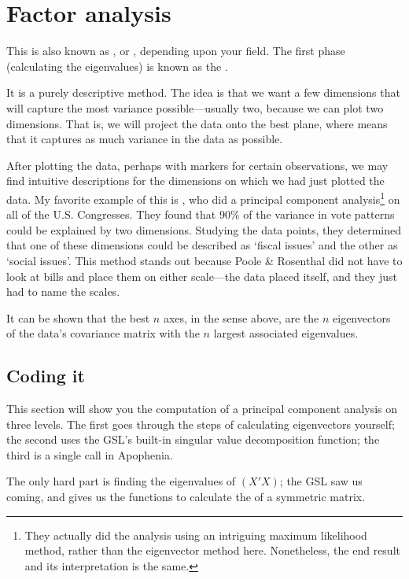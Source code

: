 \section{Factor analysis} \label{pca} 
This is also known as , or , depending upon your field. 
The first phase (calculating the eigenvalues) is known as the .

It is a purely descriptive method.  The idea is that we want a few
dimensions that will capture the most variance possible---usually two,
because we can plot two dimensions. That is, we will project the data
onto the best plane, where  means that it captures as much
variance in the data as possible.

After plotting the data, perhaps with markers for certain observations,
we may find intuitive descriptions for the dimensions on which we had just plotted the
data. My favorite example of this is \citet{poole:rosenthal},
who did a principal component analysis\footnote{They actually did
the analysis using an intriguing maximum likelihood method, rather
than the eigenvector method here. Nonetheless, the end result and its
interpretation is the same.} on all of the U.S. Congresses. They found
that 90\% of the variance in vote patterns could be explained by two dimensions.
Studying the data points, they determined that one of these dimensions could be
described as `fiscal issues' and the other as `social issues'. This method stands
out because Poole \& Rosenthal did not have to look at bills and place them on
either scale---the data placed itself, and they just had to name the scales.


It can be shown that the best $n$ axes, in the sense above, are the
$n$ eigenvectors of the data's covariance matrix with the $n$ largest
associated eigenvalues.

\subsection{Coding it}
This section will show you the computation of a principal component
analysis on three levels. The first goes through the steps of
calculating eigenvectors yourself; the second uses the 
GSL's built-in singular value decomposition function; the third is a
single call in Apophenia.

The only hard part is finding the eigenvalues of
$(X'X)$; the GSL saw us coming, and gives us the  functions
to calculate the  of a symmetric matrix.

